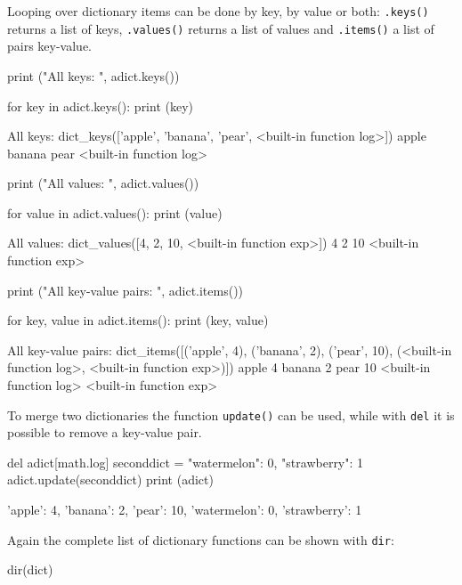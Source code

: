 Looping over dictionary items can be done by key, by value or both: \texttt{.keys()} returns a list of keys, \texttt{.values()} returns a list of values and \texttt{.items()} a list of pairs key-value.

\begin{ipython}
print ("All keys: ", adict.keys())

for key in adict.keys():
    print (key)
\end{ipython}
\begin{ioutput}
All keys:  dict_keys(['apple', 'banana', 'pear', <built-in function log>])
apple
banana
pear
<built-in function log>
\end{ioutput}
\begin{ipython}
print ("All values: ", adict.values())

for value in adict.values():
    print (value)
\end{ipython}
\begin{ioutput}
All values:  dict_values([4, 2, 10, <built-in function exp>])
4
2
10
<built-in function exp>
\end{ioutput}
\begin{ipython}
print ("All key-value pairs: ", adict.items())

for key, value in adict.items():
    print (key, value)
\end{ipython}
\begin{ioutput}
All key-value pairs:  dict_items([('apple', 4), ('banana', 2), ('pear', 10),
(<built-in function log>, <built-in function exp>)])
apple 4
banana 2
pear 10
<built-in function log> <built-in function exp>
\end{ioutput}

To merge two dictionaries the function \texttt{update()} can be used, while with \texttt{del} it is possible to remove a key-value pair.

\begin{ipython}
del adict[math.log]
seconddict = {"watermelon": 0, "strawberry": 1}
adict.update(seconddict)
print (adict)
\end{ipython}
\begin{ioutput}
{'apple': 4, 'banana': 2, 'pear': 10, 'watermelon': 0, 'strawberry': 1}
\end{ioutput}

Again the complete list of dictionary functions can be shown with \texttt{dir}:

\begin{ipython}
dir(dict)
\end{ipython}
\begin{ioutput}
\end{ioutput}

